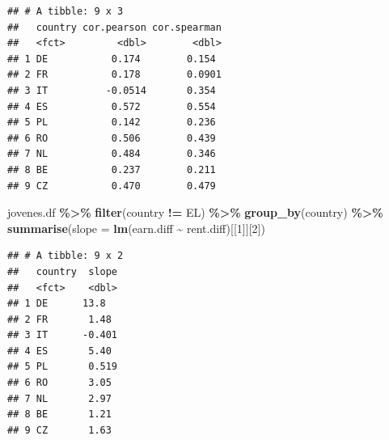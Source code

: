 \documentclass[water,article,submit,pdftex,moreauthors]{Definitions/mdpi}
\newenvironment{Shaded}{\begin{snugshade}}{\end{snugshade}}
\newcommand{\AttributeTok}[1]{\textcolor[rgb]{0.13,0.29,0.53}{#1}}
\newcommand{\DecValTok}[1]{\textcolor[rgb]{0.00,0.00,0.81}{#1}}
\newcommand{\FunctionTok}[1]{\textcolor[rgb]{0.13,0.29,0.53}{\textbf{#1}}}
\newcommand{\NormalTok}[1]{#1}
\newcommand{\SpecialCharTok}[1]{\textcolor[rgb]{0.81,0.36,0.00}{\textbf{#1}}}
\newcommand{\StringTok}[1]{\textcolor[rgb]{0.31,0.60,0.02}{#1}}
\begin{document}
\begin{verbatim}
## # A tibble: 9 x 3
##   country cor.pearson cor.spearman
##   <fct>         <dbl>        <dbl>
## 1 DE           0.174        0.154 
## 2 FR           0.178        0.0901
## 3 IT          -0.0514       0.354 
## 4 ES           0.572        0.554 
## 5 PL           0.142        0.236 
## 6 RO           0.506        0.439 
## 7 NL           0.484        0.346 
## 8 BE           0.237        0.211 
## 9 CZ           0.470        0.479
\end{verbatim}

\begin{Shaded}
\begin{Highlighting}[]
\NormalTok{jovenes.df }\SpecialCharTok{\%\textgreater{}\%} \FunctionTok{filter}\NormalTok{(country }\SpecialCharTok{!=} \StringTok{\textquotesingle{}EL\textquotesingle{}}\NormalTok{) }\SpecialCharTok{\%\textgreater{}\%} \FunctionTok{group\_by}\NormalTok{(country) }\SpecialCharTok{\%\textgreater{}\%} \FunctionTok{summarise}\NormalTok{(}\AttributeTok{slope =} \FunctionTok{lm}\NormalTok{(earn.diff }\SpecialCharTok{\textasciitilde{}}\NormalTok{ rent.diff)[[}\DecValTok{1}\NormalTok{]][}\DecValTok{2}\NormalTok{])}
\end{Highlighting}
\end{Shaded}

\begin{verbatim}
## # A tibble: 9 x 2
##   country  slope
##   <fct>    <dbl>
## 1 DE      13.8  
## 2 FR       1.48 
## 3 IT      -0.401
## 4 ES       5.40 
## 5 PL       0.519
## 6 RO       3.05 
## 7 NL       2.97 
## 8 BE       1.21 
## 9 CZ       1.63
\end{verbatim}
\end{document}
